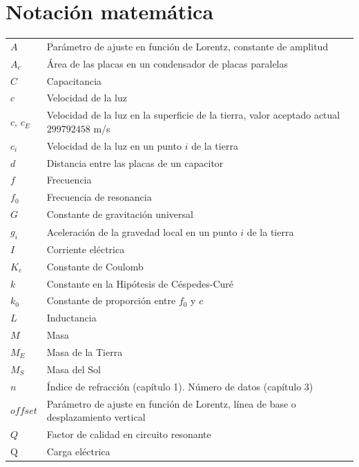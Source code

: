 

\chapter*{Notaci\'on matem\'atica}
\begin{tabular}{ll}
$A$ & Parámetro de ajuste en función de Lorentz, constante de amplitud\\
$A_c$ & Área de las placas en un condensador de placas paralelas\\    
$C$ & Capacitancia\\
$c$ & Velocidad de la luz\\
$c$, $c_E$ & Velocidad de la luz en la superficie de la tierra, valor aceptado actual $299792458$ m/s\\
$c_i$ & Velocidad de la luz en un punto $i$ de la tierra\\
$d$ & Distancia entre las placas de un capacitor\\
$f$ & Frecuencia\\
$f_0$ & Frecuencia de resonancia\\
$G$ & Constante de gravitación universal\\
$g_i$ & Aceleración de la gravedad local en un punto $i$ de la tierra\\
$I$ & Corriente eléctrica\\
$K_e$ & Constante de Coulomb\\
$k$ & Constante en la Hipótesis de Céspedes-Curé\\
$k_0$ & Constante de proporción entre $f_0$ y $c$\\
$L$ & Inductancia\\
$M$ & Masa\\
$M_E$ & Masa de la Tierra\\
$M_S$ & Masa del Sol\\
$n$ & Índice de refracción (capítulo 1). Número de datos (capítulo 3)\\
$offset$ &  Parámetro de ajuste en función de Lorentz, línea de base o desplazamiento vertical\\
$Q$ & Factor de calidad en circuito resonante\\
$\mathrm{Q}$ & Carga eléctrica\\

\end{tabular}
